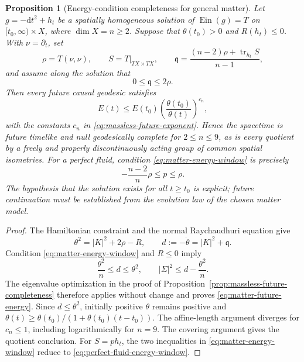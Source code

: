 \documentclass[10pt,a4paper]{article}
\numberwithin{equation}{section}
\newtheorem{proposition}[theorem]{Proposition}
\theoremstyle{definition}
\theoremstyle{remark}
\newcommand{\dd}{\mathrm d}
\begin{document}
\begin{proposition}[Energy-condition completeness for general matter]
\label{prop:energy-condition-future}
Let $g=-\dd t^2+h_t$ be a spatially homogeneous solution of
$\operatorname{Ein}(g)=T$ on $[t_0,\infty)\times X$, where
$\dim X=n\ge2$.  Suppose that $\theta(t_0)>0$ and $R(h_t)\le0$.
With $\nu=\partial_t$, set
\[
 \rho=T(\nu,\nu),\qquad S=T|_{TX\times TX},\qquad
 \mathfrak q=\frac{(n-2)\rho+\operatorname{tr}_{h_t}S}{n-1},
\]
and assume along the solution that
\begin{equation}
 0\le\mathfrak q\le2\rho.
 \label{eq:matter-energy-window}
\end{equation}
Then every future causal geodesic satisfies
\begin{equation}
 E(t)\le E(t_0)
 \left(\frac{\theta(t_0)}{\theta(t)}\right)^{c_n},
 \label{eq:matter-future-energy}
\end{equation}
with the constants $c_n$ in
\eqref{eq:massless-future-exponent}.  Hence the spacetime is future
timelike and null geodesically complete for $2\le n\le9$, as is every
quotient by a freely and properly discontinuously acting group of common
spatial isometries.  For a perfect fluid, condition
\eqref{eq:matter-energy-window} is precisely
\begin{equation}
 -\frac{n-2}{n}\rho\le p\le\rho.
 \label{eq:perfect-fluid-energy-window}
\end{equation}
The hypothesis that the solution exists for all $t\ge t_0$ is explicit;
future continuation must be established from the evolution law of the
chosen matter model.
\end{proposition}

\begin{proof}
The Hamiltonian constraint and the normal Raychaudhuri equation give
\[
 \theta^2=|K|^2+2\rho-R,
 \qquad d:=-\dot\theta=|K|^2+\mathfrak q.
\]
Condition \eqref{eq:matter-energy-window} and $R\le0$ imply
\[
 \frac{\theta^2}{n}\le d\le\theta^2,
 \qquad
 |\Sigma|^2\le d-\frac{\theta^2}{n}.
\]
The eigenvalue optimization in the proof of
Proposition~\ref{prop:massless-future-completeness} therefore applies
without change and proves \eqref{eq:matter-future-energy}.  Since
$d\le\theta^2$, initially positive $\theta$ remains positive and
$\theta(t)\ge\theta(t_0)/(1+\theta(t_0)(t-t_0))$.  The affine-length
argument diverges for $c_n\le1$, including logarithmically for $n=9$.
The covering argument gives the quotient conclusion.  For
$S=ph_t$, the two inequalities in
\eqref{eq:matter-energy-window} reduce to
\eqref{eq:perfect-fluid-energy-window}.
\end{proof}
\end{document}
